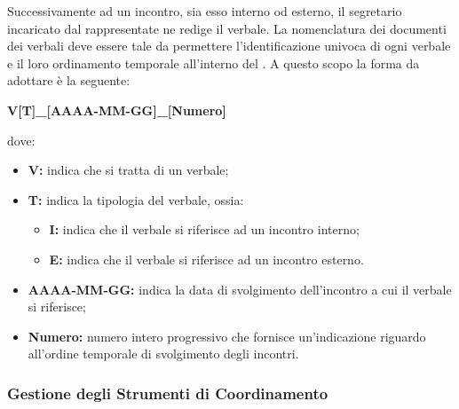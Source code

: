 				Successivamente ad un incontro, sia esso interno od esterno, il segretario incaricato dal rappresentate ne redige il verbale.
				\newline
				La nomenclatura dei documenti dei verbali deve essere tale da permettere l'identificazione univoca di ogni verbale e il loro ordinamento temporale all'interno del . A questo scopo la forma da adottare è la seguente:
				\begin{center}
					\textbf{V[T]_[AAAA-MM-GG]_[Numero]}
				\end{center}
				dove:
				\begin{itemize}
					\item \textbf{V:} indica che si tratta di un verbale;
					\item \textbf{T:} indica la tipologia del verbale, ossia:
					\begin{itemize}
						\item \textbf{I:} indica che il verbale si riferisce ad un incontro interno;
						\item \textbf{E:} indica che il verbale si riferisce ad un incontro esterno.
					\end{itemize}
					\item \textbf{AAAA-MM-GG:} indica la data di svolgimento dell'incontro a cui il verbale si riferisce;
					\item \textbf{Numero:} numero intero progressivo che fornisce un'indicazione riguardo all'ordine temporale di svolgimento degli incontri.
				\end{itemize}
		
		\subsubsection{Gestione degli Strumenti di Coordinamento}

